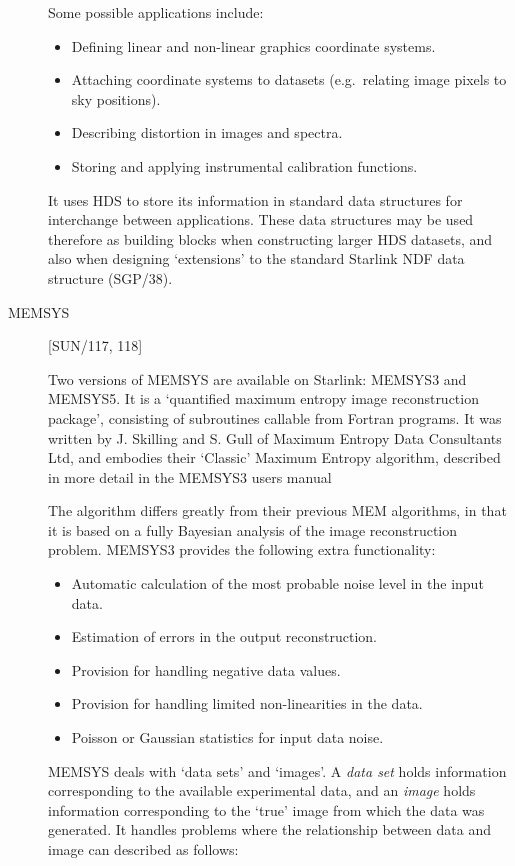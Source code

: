 \begin{description}
Some possible applications include:
\begin{itemize}
\item Defining linear and non-linear graphics coordinate systems.
\item Attaching coordinate systems to datasets (e.g.\ relating image pixels to
 sky positions).
\item Describing distortion in images and spectra.
\item Storing and applying instrumental calibration functions.
\end{itemize}

It uses HDS to store its information in standard data structures for
interchange between applications. 
These data structures may be used therefore as building blocks when
constructing larger HDS datasets, and also when designing `extensions' to
the standard Starlink NDF data structure (SGP/38). 

\item [MEMSYS] \hfill [SUN/117, 118]

Two versions of MEMSYS are available on Starlink: MEMSYS3 and MEMSYS5.
It is a `quantified maximum entropy image reconstruction package',
consisting of subroutines callable from Fortran programs.
It was written by J. Skilling and S. Gull of Maximum Entropy Data 
Consultants Ltd, and embodies their `Classic' Maximum Entropy 
algorithm, described in more detail in the MEMSYS3 users manual

The algorithm differs greatly from their previous MEM algorithms, in
that it is based on a fully Bayesian analysis of the image reconstruction
problem.
MEMSYS3 provides the following extra functionality:
\begin {itemize}
\item Automatic calculation of the most probable noise level in the input 
data.
\item Estimation of errors in the output reconstruction.
\item Provision for handling negative data values.
\item Provision for handling limited non-linearities in the data.
\item Poisson or Gaussian statistics for input data noise.
\end {itemize}

MEMSYS deals with `data sets' and `images'.
A {\em data set} holds information corresponding to the available experimental
data, and an {\em image} holds information corresponding to the `true' image
from which the data was generated.
It handles problems where the relationship between data and image can
described as follows: 


\end{description}
